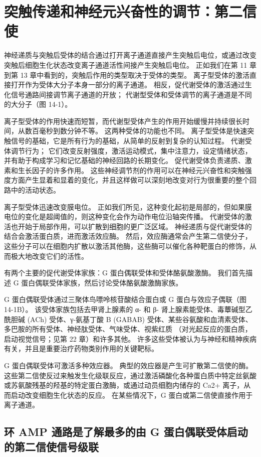 \chapter{突触传递和神经元兴奋性的调节：第二信使}
神经递质与突触后受体的结合通过打开离子通道直接产生突触后电位，或通过改变突触后细胞生化状态改变离子通道活性间接产生突触后电位。 正如我们在第 11 章到第 13 章中看到的，突触后作用的类型取决于受体的类型。 离子型受体的激活直接打开作为受体大分子本身一部分的离子通道。 相反，促代谢受体的激活通过生化信号通路间接调节离子通道的开放； 代谢型受体和受体调节的离子通道是不同的大分子（图 14-1）。

离子型受体的作用快速而短暂，而代谢型受体产生的作用开始缓慢并持续很长时间，从数百毫秒到数分钟不等。 这两种受体的功能也不同。 离子型受体是快速突触信号的基础，它是所有行为的基础，从简单的反射到复杂的认知过程。 代谢受体调节行为； 它们改变反射强度，激活运动模式，集中注意力，设定情绪状态，并有助于构成学习和记忆基础的神经回路的长期变化。 促代谢受体负责递质、激素和生长因子的许多作用。 这些神经调节剂的作用可以在神经元兴奋性和突触强度方面产生显着和显着的变化，并且这样做可以深刻地改变对行为很重要的整个回路中的活动状态。

离子型受体迅速改变膜电位。 正如我们所见，这种变化起初是局部的，但如果膜电位的变化是超阈值的，则这种变化会作为动作电位沿轴突传播。 代谢受体的激活也开始于局部作用，可以扩散到细胞的更广泛区域。 神经递质与促代谢受体的结合会激活蛋白质，进而激活效应酶。 然后，效应酶通常会产生第二信使分子，这些分子可以在细胞内扩散以激活其他酶，这些酶可以催化各种靶蛋白的修饰，从而极大地改变它们的活性。

有两个主要的促代谢受体家族：G 蛋白偶联受体和受体酪氨酸激酶。 我们首先描述 G 蛋白偶联受体家族，然后讨论受体酪氨酸激酶家族。

G 蛋白偶联受体通过三聚体鸟嘌呤核苷酸结合蛋白或 G 蛋白与效应子偶联（图 14-1B）。 该受体家族包括去甲肾上腺素的 α- 和 β- 肾上腺素能受体、毒蕈碱型乙酰胆碱 (ACh) 受体、γ-氨基丁酸 B (GABAB) 受体、某些谷氨酸和血清素受体、多巴胺的所有受体、神经肽受体、气味受体、视紫红质 （对光起反应的蛋白质，启动视觉信号；见第 22 章）和许多其他。 许多这些受体被认为与神经和精神疾病有关，并且是重要治疗药物类别作用的关键靶标。

G 蛋白偶联受体可激活多种效应器。 典型的效应器是产生可扩散第二信使的酶。 这些第二信使反过来触发生化级联反应，通过激活磷酸化各种蛋白质中特定丝氨酸或苏氨酸残基的羟基的特定蛋白激酶，或通过动员细胞内储存的 Ca2+ 离子，从而启动改变细胞生化状态的反应。 在某些情况下，G 蛋白或第二信使直接作用于离子通道。

\section{环 AMP 通路是了解最多的由 G 蛋白偶联受体启动的第二信使信号级联}

